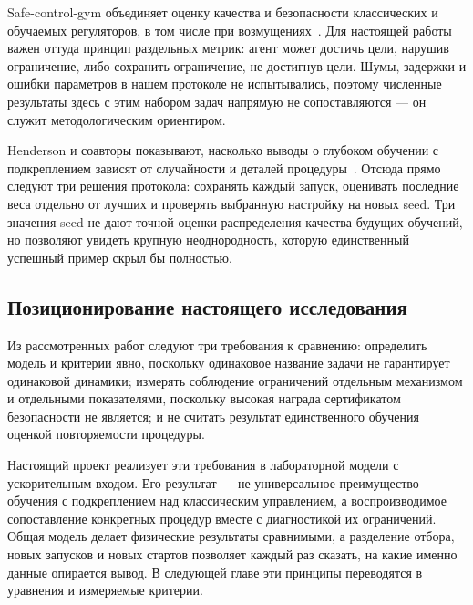 Safe-control-gym объединяет оценку качества и безопасности классических и обучаемых регуляторов, в том числе при возмущениях~\cite{yuan}. Для настоящей работы важен оттуда принцип раздельных метрик: агент может достичь цели, нарушив ограничение, либо сохранить ограничение, не достигнув цели. Шумы, задержки и ошибки параметров в нашем протоколе не испытывались, поэтому численные результаты здесь с этим набором задач напрямую не сопоставляются — он служит методологическим ориентиром.

Henderson и соавторы показывают, насколько выводы о глубоком обучении с подкреплением зависят от случайности и деталей процедуры~\cite{henderson}. Отсюда прямо следуют три решения протокола: сохранять каждый запуск, оценивать последние веса отдельно от лучших и проверять выбранную настройку на новых seed. Три значения seed не дают точной оценки распределения качества будущих обучений, но позволяют увидеть крупную неоднородность, которую единственный успешный пример скрыл бы полностью.

\subsection{Позиционирование настоящего исследования}
Из рассмотренных работ следуют три требования к сравнению: определить модель и критерии явно, поскольку одинаковое название задачи не гарантирует одинаковой динамики; измерять соблюдение ограничений отдельным механизмом и отдельными показателями, поскольку высокая награда сертификатом безопасности не является; и не считать результат единственного обучения оценкой повторяемости процедуры.

Настоящий проект реализует эти требования в лабораторной модели с ускорительным входом. Его результат — не универсальное преимущество обучения с подкреплением над классическим управлением, а воспроизводимое сопоставление конкретных процедур вместе с диагностикой их ограничений. Общая модель делает физические результаты сравнимыми, а разделение отбора, новых запусков и новых стартов позволяет каждый раз сказать, на какие именно данные опирается вывод. В следующей главе эти принципы переводятся в уравнения и измеряемые критерии.

